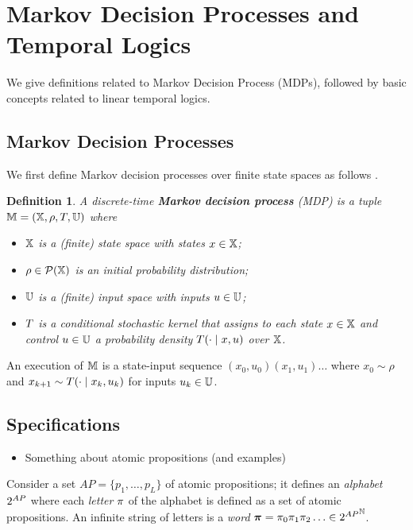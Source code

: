 \documentclass[conference]{IEEEtran}
\newtheorem{definition}{Definition}
\begin{document}
\section{Markov Decision Processes and Temporal Logics}

We give definitions related to Markov Decision Process (MDPs), followed by basic concepts related to linear temporal logics.

\subsection{Markov Decision Processes}

We first define Markov decision processes over finite state spaces as follows \cite{hll1996}.
\begin{definition}
\label{def:MDP}
  A discrete-time \textbf{Markov decision process} (MDP) is a tuple $\mathbb{M} = (\mathbb{X}, \rho, T, \mathbb{U})$ where
  \begin{itemize}
    \item $\mathbb{X}$ is a (finite) state space with states $x\in\mathbb{X}$; %
    \item $\rho \in \mathcal P(\mathbb{X})$ is an initial probability distribution;
    \item $\mathbb{U}$ is a (finite) input space with inputs $u\in\mathbb{U}$;
    \item $T$ is a conditional stochastic kernel that assigns to each state $x\in \mathbb{X}$ and control $u\in \mathbb{U}$ a probability density $T(\cdot\mid x,u)$ over $\mathbb{X}$.
  \end{itemize}
\end{definition}

An execution of $\mathbb{M}$ is a state-input sequence $(x_0, u_0)(x_1, u_1)\ldots$ where $x_0 \sim \rho$ and $x_{k+1} \sim T(\cdot \mid x_k, u_k)$ for inputs $u_k \in \mathbb{U}$. 

\subsection{Specifications}

\begin{itemize}
  \item Something about atomic propositions (and examples)
\end{itemize}

Consider a set $AP = \{ p_1, \ldots, p_L \}$ of atomic propositions; it defines an \emph{alphabet} ${2^{AP}}$ where each \emph{letter} $\pi$ of the alphabet is defined as a set of atomic propositions. An infinite string of letters is a \emph{word} $\boldsymbol{\pi}=\pi_0\pi_1\pi_2\ldots\in{2^{AP}}^{\mathbb{N}}$.
\end{document}

